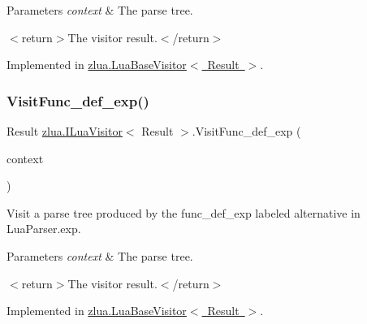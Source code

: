 \begin{DoxyParams}{Parameters}
{\em context} & The parse tree.\\
\hline
\end{DoxyParams}
$<$return$>$The visitor result.$<$/return$>$ 

Implemented in \mbox{\hyperlink{classzlua_1_1_lua_base_visitor_ae4969a8795b22c20db3d5f1339484c47}{zlua.\+Lua\+Base\+Visitor$<$ Result $>$}}.

\mbox{\label{interfacezlua_1_1_i_lua_visitor_a2907308bdf63ed2a3311e89b411f0bb5}} 
\subsubsection{\texorpdfstring{Visit\+Func\+\_\+def\+\_\+exp()}{VisitFunc\_def\_exp()}}
{\footnotesize\ttfamily Result \mbox{\hyperlink{interfacezlua_1_1_i_lua_visitor}{zlua.\+I\+Lua\+Visitor}}$<$ Result $>$.Visit\+Func\+\_\+def\+\_\+exp (\begin{DoxyParamCaption}\item[{\mbox{[}\+Not\+Null\mbox{]} \mbox{\hyperlink{classzlua_1_1_lua_parser_1_1_func__def__exp_context}{Lua\+Parser.\+Func\+\_\+def\+\_\+exp\+Context}}}]{context }\end{DoxyParamCaption})}



Visit a parse tree produced by the {\ttfamily func\+\_\+def\+\_\+exp} labeled alternative in Lua\+Parser.\+exp. 


\begin{DoxyParams}{Parameters}
{\em context} & The parse tree.\\
\hline
\end{DoxyParams}
$<$return$>$The visitor result.$<$/return$>$ 

Implemented in \mbox{\hyperlink{classzlua_1_1_lua_base_visitor_adfce03f603d9109a1cac5ff92c9b8642}{zlua.\+Lua\+Base\+Visitor$<$ Result $>$}}.

\mbox{\label{interfacezlua_1_1_i_lua_visitor_a784e05c705956dc10a1df269f7efbb3c}} 
